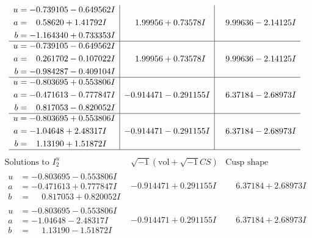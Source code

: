 \documentclass[1p]{elsarticle_modified}
\theoremstyle{definition}
\newcommand{\I}{\sqrt{-1}}
\begin{document}
$$\begin{array}{c|c|c}
\begin{aligned}
u &= -0.739105 - 0.649562 I \\
a &= \phantom{-}0.58620 + 1.41792 I \\
b &= -1.164340 + 0.733353 I\end{aligned}
 & \phantom{-}1.99956 + 0.73578 I & \phantom{-}9.99636 - 2.14125 I \\ \hline\begin{aligned}
u &= -0.739105 - 0.649562 I \\
a &= \phantom{-}0.261702 - 0.107022 I \\
b &= -0.984287 - 0.409104 I\end{aligned}
 & \phantom{-}1.99956 + 0.73578 I & \phantom{-}9.99636 - 2.14125 I \\ \hline\begin{aligned}
u &= -0.803695 + 0.553806 I \\
a &= -0.471613 - 0.777847 I \\
b &= \phantom{-}0.817053 - 0.820052 I\end{aligned}
 & -0.914471 - 0.291155 I & \phantom{-}6.37184 - 2.68973 I \\ \hline\begin{aligned}
u &= -0.803695 + 0.553806 I \\
a &= -1.04648 + 2.48317 I \\
b &= \phantom{-}1.13190 + 1.51872 I\end{aligned}
 & -0.914471 - 0.291155 I & \phantom{-}6.37184 - 2.68973 I\\
 \hline 
 \end{array}$$\newpage$$\begin{array}{c|c|c}  
\text{Solutions to }I^u_{2}& \I (\text{vol} + \sqrt{-1}CS) & \text{Cusp shape}\\
 \hline 
\begin{aligned}
u &= -0.803695 - 0.553806 I \\
a &= -0.471613 + 0.777847 I \\
b &= \phantom{-}0.817053 + 0.820052 I\end{aligned}
 & -0.914471 + 0.291155 I & \phantom{-}6.37184 + 2.68973 I \\ \hline\begin{aligned}
u &= -0.803695 - 0.553806 I \\
a &= -1.04648 - 2.48317 I \\
b &= \phantom{-}1.13190 - 1.51872 I\end{aligned}
 & -0.914471 + 0.291155 I & \phantom{-}6.37184 + 2.68973 I \\ \hline\begin{aligned}

\end{aligned}
\end{array}$$
\end{document}
